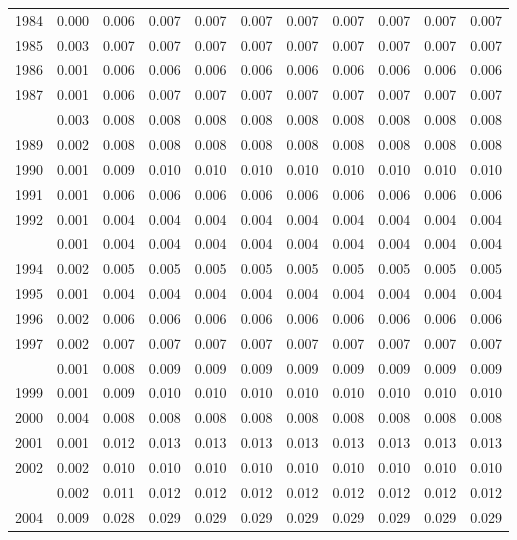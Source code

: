 \documentclass[
]{article}
\begin{document}
\begin{longtable}[t]{lrrrrrrrrrr}
1984 & 0.000 & 0.006 & 0.007 & 0.007 & 0.007 & 0.007 & 0.007 & 0.007 & 0.007 & 0.007\\
1985 & 0.003 & 0.007 & 0.007 & 0.007 & 0.007 & 0.007 & 0.007 & 0.007 & 0.007 & 0.007\\
1986 & 0.001 & 0.006 & 0.006 & 0.006 & 0.006 & 0.006 & 0.006 & 0.006 & 0.006 & 0.006\\
1987 & 0.001 & 0.006 & 0.007 & 0.007 & 0.007 & 0.007 & 0.007 & 0.007 & 0.007 & 0.007\\
\addlinespace
1988 & 0.003 & 0.008 & 0.008 & 0.008 & 0.008 & 0.008 & 0.008 & 0.008 & 0.008 & 0.008\\
1989 & 0.002 & 0.008 & 0.008 & 0.008 & 0.008 & 0.008 & 0.008 & 0.008 & 0.008 & 0.008\\
1990 & 0.001 & 0.009 & 0.010 & 0.010 & 0.010 & 0.010 & 0.010 & 0.010 & 0.010 & 0.010\\
1991 & 0.001 & 0.006 & 0.006 & 0.006 & 0.006 & 0.006 & 0.006 & 0.006 & 0.006 & 0.006\\
1992 & 0.001 & 0.004 & 0.004 & 0.004 & 0.004 & 0.004 & 0.004 & 0.004 & 0.004 & 0.004\\
\addlinespace
1993 & 0.001 & 0.004 & 0.004 & 0.004 & 0.004 & 0.004 & 0.004 & 0.004 & 0.004 & 0.004\\
1994 & 0.002 & 0.005 & 0.005 & 0.005 & 0.005 & 0.005 & 0.005 & 0.005 & 0.005 & 0.005\\
1995 & 0.001 & 0.004 & 0.004 & 0.004 & 0.004 & 0.004 & 0.004 & 0.004 & 0.004 & 0.004\\
1996 & 0.002 & 0.006 & 0.006 & 0.006 & 0.006 & 0.006 & 0.006 & 0.006 & 0.006 & 0.006\\
1997 & 0.002 & 0.007 & 0.007 & 0.007 & 0.007 & 0.007 & 0.007 & 0.007 & 0.007 & 0.007\\
\addlinespace
1998 & 0.001 & 0.008 & 0.009 & 0.009 & 0.009 & 0.009 & 0.009 & 0.009 & 0.009 & 0.009\\
1999 & 0.001 & 0.009 & 0.010 & 0.010 & 0.010 & 0.010 & 0.010 & 0.010 & 0.010 & 0.010\\
2000 & 0.004 & 0.008 & 0.008 & 0.008 & 0.008 & 0.008 & 0.008 & 0.008 & 0.008 & 0.008\\
2001 & 0.001 & 0.012 & 0.013 & 0.013 & 0.013 & 0.013 & 0.013 & 0.013 & 0.013 & 0.013\\
2002 & 0.002 & 0.010 & 0.010 & 0.010 & 0.010 & 0.010 & 0.010 & 0.010 & 0.010 & 0.010\\
\addlinespace
2003 & 0.002 & 0.011 & 0.012 & 0.012 & 0.012 & 0.012 & 0.012 & 0.012 & 0.012 & 0.012\\
2004 & 0.009 & 0.028 & 0.029 & 0.029 & 0.029 & 0.029 & 0.029 & 0.029 & 0.029 & 0.029\\

\end{longtable}
\end{document}
